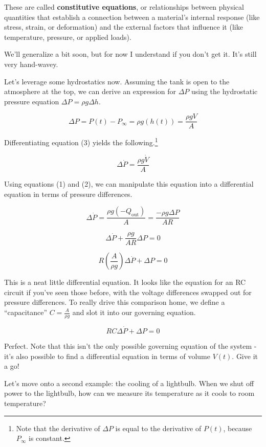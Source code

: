 \documentclass[
  letterpaper,
  DIV=11,
  numbers=noendperiod]{scrreprt}
\begin{document}
These are called \textbf{constitutive equations}, or relationships
between physical quantities that establish a connection between a
material's internal response (like stress, strain, or deformation) and
the external factors that influence it (like temperature, pressure, or
applied loads).

We'll generalize a bit soon, but for now I understand if you don't get
it. It's still very hand-wavey.

Let's leverage some hydrostatics now. Assuming the tank is open to the
atmosphere at the top, we can derive an expression for \(\Delta P\)
using the hydrostatic pressure equation \(\Delta P = \rho g \Delta h\).

\[\Delta P = P(t) - P_\infty = \rho g \left(h(t) \right) = \frac{\rho g V}{A}\tag{3}\]

Differentiating equation (3) yields the following.\footnote{Note that
  the derivative of \(\Delta P\) is equal to the derivative of \(P(t)\),
  because \(P_\infty\) is constant.}

\[ \Delta \dot{P}  = \frac{\rho g \dot{V}}{A} \]

Using equations (1) and (2), we can manipulate this equation into a
differential equation in terms of pressure differences.

\[ \Delta \dot{P} = \frac{\rho g \left(- Q_\text{out} \right)}{A} = \frac{- \rho g \Delta P}{A R}\]

\[\Delta \dot{P} + \frac{\rho g}{A R} \Delta P = 0\]

\[R \left( \frac{A}{\rho g}\right) \Delta \dot{P} + \Delta P = 0\]

This is a neat little differential equation. It looks like the equation
for an RC circuit if you've seen those before, with the voltage
differences swapped out for pressure differences. To really drive this
comparison home, we define a ``capacitance'' \(C = \frac{A}{\rho g}\)
and slot it into our governing equation.

\[\boxed{RC \Delta \dot{P} + \Delta P = 0}\]

Perfect. Note that this isn't the only possible governing equation of
the system - it's also possible to find a differential equation in terms
of volume \(V(t)\). Give it a go!

Let's move onto a second example: the cooling of a lightbulb. When we
shut off power to the lightbulb, how can we measure its temperature as
it cools to room temperature?
\end{document}

